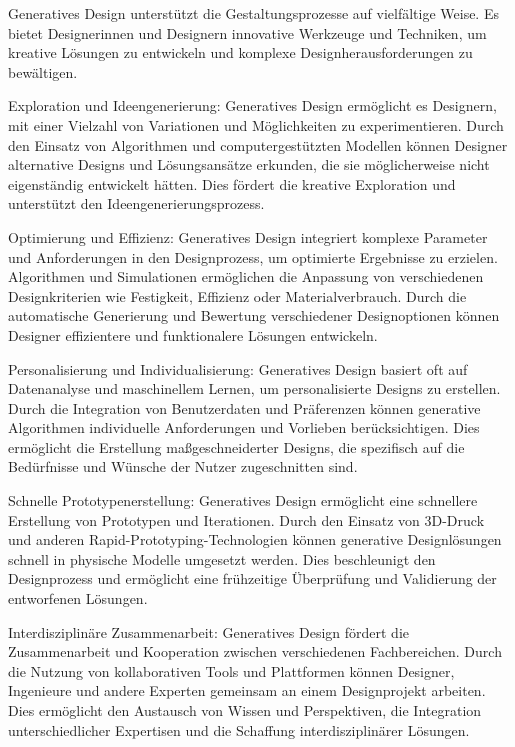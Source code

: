 Generatives Design unterstützt die Gestaltungsprozesse auf vielfältige Weise. Es bietet Designerinnen und Designern innovative Werkzeuge und Techniken, um kreative Lösungen zu entwickeln und komplexe Designherausforderungen zu bewältigen.

Exploration und Ideengenerierung: Generatives Design ermöglicht es Designern, mit einer Vielzahl von Variationen und Möglichkeiten zu experimentieren. Durch den Einsatz von Algorithmen und computergestützten Modellen können Designer alternative Designs und Lösungsansätze erkunden, die sie möglicherweise nicht eigenständig entwickelt hätten. Dies fördert die kreative Exploration und unterstützt den Ideengenerierungsprozess.

Optimierung und Effizienz: Generatives Design integriert komplexe Parameter und Anforderungen in den Designprozess, um optimierte Ergebnisse zu erzielen. Algorithmen und Simulationen ermöglichen die Anpassung von verschiedenen Designkriterien wie Festigkeit, Effizienz oder Materialverbrauch. Durch die automatische Generierung und Bewertung verschiedener Designoptionen können Designer effizientere und funktionalere Lösungen entwickeln.

Personalisierung und Individualisierung: Generatives Design basiert oft auf Datenanalyse und maschinellem Lernen, um personalisierte Designs zu erstellen. Durch die Integration von Benutzerdaten und Präferenzen können generative Algorithmen individuelle Anforderungen und Vorlieben berücksichtigen. Dies ermöglicht die Erstellung maßgeschneiderter Designs, die spezifisch auf die Bedürfnisse und Wünsche der Nutzer zugeschnitten sind.

Schnelle Prototypenerstellung: Generatives Design ermöglicht eine schnellere Erstellung von Prototypen und Iterationen. Durch den Einsatz von 3D-Druck und anderen Rapid-Prototyping-Technologien können generative Designlösungen schnell in physische Modelle umgesetzt werden. Dies beschleunigt den Designprozess und ermöglicht eine frühzeitige Überprüfung und Validierung der entworfenen Lösungen.

Interdisziplinäre Zusammenarbeit: Generatives Design fördert die Zusammenarbeit und Kooperation zwischen verschiedenen Fachbereichen. Durch die Nutzung von kollaborativen Tools und Plattformen können Designer, Ingenieure und andere Experten gemeinsam an einem Designprojekt arbeiten. Dies ermöglicht den Austausch von Wissen und Perspektiven, die Integration unterschiedlicher Expertisen und die Schaffung interdisziplinärer Lösungen.

